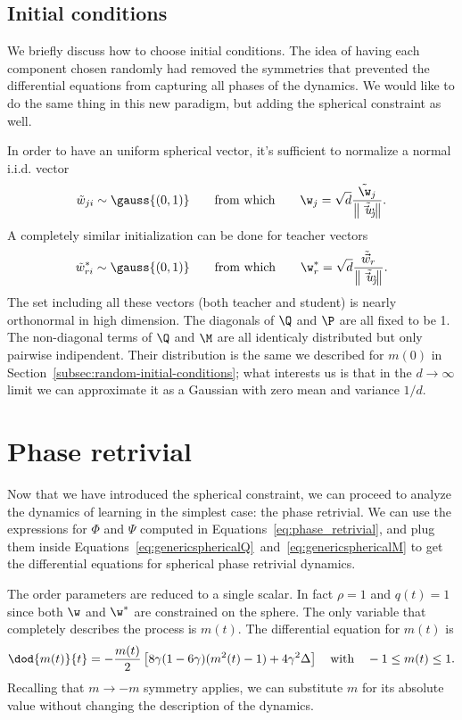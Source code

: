 \subsection{Initial conditions} \label{subsec:initial-condition-phaseretrivial}
We briefly discuss how to choose initial conditions.
The idea of having each component chosen randomly had removed the symmetries that prevented the differential equations from capturing all phases of the dynamics.
We would like to do the same thing in this new paradigm, but adding the spherical constraint as well.

In order to have an uniform spherical vector, it's sufficient to normalize a normal i.i.d. vector
\[
  \tilde{w}_{ji} \sim \gauss{(0,1)}\qquad\text{from which}\qquad \w_{j} = \sqrt{d}\frac{\tilde{\w}_{j}}{\left\|\tilde{\vec{w}_j}\right\|}.
\]
A completely similar initialization can be done for teacher vectors
\[
  \tilde{w}^*_{ri} \sim \gauss{(0,1)}\qquad\text{from which}\qquad \w^*_{r} = \sqrt{d}\frac{\tilde{\vec{w}}_{r}}{\left\|\tilde{\vec{w}_j}\right\|}.
\]
The set including all these vectors (both teacher and student) is nearly orthonormal in high dimension.
The diagonals of \(\Q\) and \(\P\) are all fixed to be 1. The non-diagonal terms of \(\Q\) and \(\M\) are all identicaly
distributed but only pairwise indipendent. Their distribution is the same we described for \(m(0)\) in Section~\ref{subsec:random-initial-conditions};
what interests us is that in the \(d\to\infty\) limit we can approximate it as a Gaussian with zero mean and variance \(1/d\).

\section{Phase retrivial} \label{sec:spherical_phase_retrivial}
Now that we have introduced the spherical constraint,
we can proceed to analyze the dynamics of learning in the simplest case: the phase retrivial.
We can use the expressions for \(\Phi\) and \(\Psi\) computed in Equations~\eqref{eq:phase_retrivial},
and plug them inside Equations~\eqref{eq:genericsphericalQ}~and~\eqref{eq:genericsphericalM} to get the 
differential equations for spherical phase retrivial dynamics.

The order parameters are reduced to a single scalar.
In fact \(\rho=1\) and \(q(t)=1\) since both \(\w\) and \(\w^*\) are constrained on the sphere.
The only variable that completely describes the process is \(m(t)\).
The differential equation for \(m(t)\) is
\begin{equation} \label{eq:spherical-phaseretrivial}
  \dod{m{(t)}}{t} = -\frac{m{(t)}}{2}\left[8\gamma(1-6\gamma)(m^2{(t)}-1)+4\gamma^2\Delta\right]\quad\text{with}\quad
  -1\le m(t)\le 1.
\end{equation}
Recalling that \(m\to-m\) symmetry applies,
we can substitute \(m\) for its absolute value without changing the description of the dynamics.

